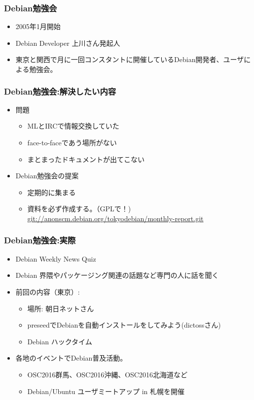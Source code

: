 \begin{frame}
\frametitle{Debian勉強会}
\begin{itemize}
 \item 2005年1月開始
 \item Debian Developer 上川さん発起人
\item 東京と関西で月に一回コンスタントに開催しているDebian開発者、ユーザによる勉強会。
\end{itemize}
\end{frame}

\begin{frame}

\frametitle{Debian勉強会:解決したい内容}
\begin{itemize}
 \item<1-> 問題
       \begin{itemize}
	\item MLとIRCで情報交換していた
	\item face-to-faceであう場所がない
	\item まとまったドキュメントが出てこない
       \end{itemize}
 \item<2-> Debian勉強会の提案
       \begin{itemize}
	\item 定期的に集まる
	\item 資料を必ず作成する。（GPLで！) \\
	  {\small \url{git://anonscm.debian.org/tokyodebian/monthly-report.git}}
       \end{itemize}
\end{itemize}

\end{frame}

\begin{frame}
 \frametitle{Debian勉強会:実際}
 \begin{itemize}
  \item Debian Weekly News Quiz
  \item Debian 界隈やパッケージング関連の話題など専門の人に話を聞く
  \item 前回の内容（東京）:\\
	\begin{itemize}
	\item 場所: 朝日ネットさん
	\item preseedでDebianを自動インストールをしてみよう(dictossさん)
	\item Debian ハックタイム
	\end{itemize}
  \item 各地のイベントでDebian普及活動。 
	\begin{itemize}
	  \item OSC2016群馬、OSC2016沖縄、OSC2016北海道など
	  \item Debian/Ubuntu ユーザミートアップ in 札幌を開催
	\end{itemize}
 \end{itemize}
\end{frame}

